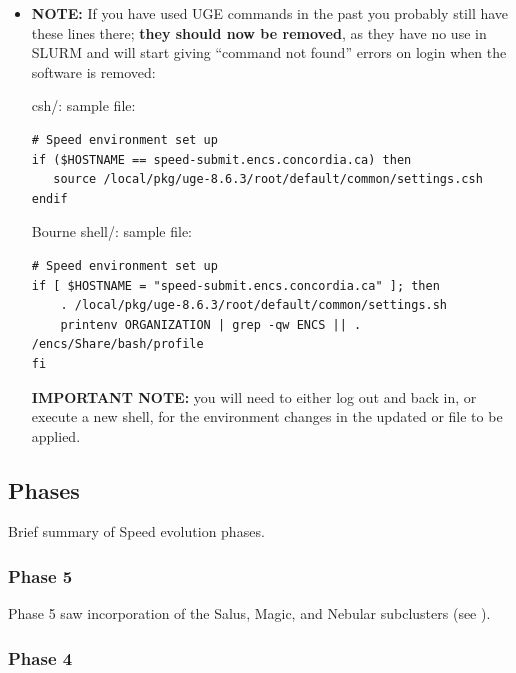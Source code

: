 \documentclass{easychair}
\begin{document}
\begin{itemize}
\item
\noindent
\textbf{NOTE:} If you have used UGE commands in the past you probably still have these
lines there; \textbf{they should now be removed}, as they have no use in SLURM and
will start giving ``command not found'' errors on login when the software is removed:

csh/: sample  file:
\begin{verbatim}
# Speed environment set up 
if ($HOSTNAME == speed-submit.encs.concordia.ca) then
   source /local/pkg/uge-8.6.3/root/default/common/settings.csh
endif
\end{verbatim}

Bourne shell/: sample  file:
\begin{verbatim}
# Speed environment set up 
if [ $HOSTNAME = "speed-submit.encs.concordia.ca" ]; then
    . /local/pkg/uge-8.6.3/root/default/common/settings.sh
    printenv ORGANIZATION | grep -qw ENCS || . /encs/Share/bash/profile
fi
\end{verbatim}

\textbf{IMPORTANT NOTE:} you will need to either log out and back in, or execute a new shell, 
for the environment changes in the updated  or  file to be applied.

\end{itemize}

\subsection{Phases}
\label{sect:phases}

Brief summary of Speed evolution phases.

\subsubsection{Phase 5}

Phase 5 saw incorporation of the Salus, Magic, and Nebular
subclusters (see ).

\subsubsection{Phase 4}
\end{document}
